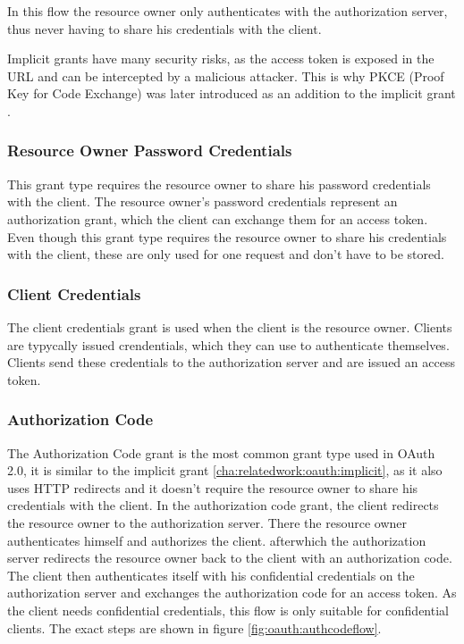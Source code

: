 In this flow the resource owner only authenticates with the authorization server, 
thus never having to share his credentials with the client.

Implicit grants have many security risks, as the access token is exposed in the URL and can be intercepted by a malicious attacker.
This is why PKCE (Proof Key for Code Exchange) was later introduced as an addition to the implicit grant \cite{rfcPkce}.

\subsubsection{Resource Owner Password Credentials}
\label{cha:relatedwork:oauth:passwordcredentials}

This grant type requires the resource owner to share his password credentials with the client.
The resource owner's password credentials represent an authorization grant,
which the client can exchange them for an access token.
Even though this grant type requires the resource owner to share his credentials with the client,
these are only used for one request and don't have to be stored.


\subsubsection{Client Credentials}
\label{cha:relatedwork:oauth:cleintcredentials}

The client credentials grant is used when the client is the resource owner.
Clients are typycally issued crendentials, which they can use to authenticate themselves.
Clients send these credentials to the authorization server and are issued an access token.

\subsubsection{Authorization Code}
\label{cha:relatedwork:oauth:authcode}

The Authorization Code grant is the most common grant type used in OAuth 2.0,
it is similar to the implicit grant \ref{cha:relatedwork:oauth:implicit}, as it also uses HTTP redirects and it doesn't require the resource owner to share his credentials with the client.
In the authorization code grant, the client redirects the resource owner to the authorization server.
There the resource owner authenticates himself and authorizes the client.
afterwhich the authorization server redirects the resource owner back to the client with an authorization code.
The client then authenticates itself with his confidential credentials on the authorization server and exchanges the authorization code for an access token.
As the client needs confidential credentials, this flow is only suitable for confidential clients.
The exact steps are shown in figure \ref{fig:oauth:authcodeflow}.

